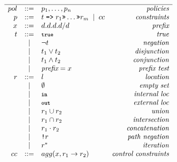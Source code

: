 \documentclass{sig-alternate-10pt}
\newcommand{\CD}[1]{\texttt{\small #1}}  %
\newcommand{\KW}[1]{\texttt{\small\bfseries{#1}}}
\newcommand{\True}{\CD{true}}
\newcommand{\Prefer}{\texttt{>>}}
\newcommand{\Path}{\texttt{=>}}
\newcommand{\In}{\KW{in}}
\newcommand{\Out}{\KW{out}}
\newcommand{\NOT}{\texttt{!}}
\begin{document}
\begin{figure}[t]\small
  \begin{minipage}[t]{.45\linewidth}
  \vspace*{-1\baselineskip}
  \[ \begin{array}{rclr}
    \hline%

     pol     &::=& p_1, \dots, p_n & \textit{policies} \\
     p       &::=& t \hspace{.3em} \Path \hspace{.3em} r_1 \Prefer \dots \Prefer r_m \BNFALT cc & \textit{constraints} \\
     x       &::=& d.d.d.d/d & \textit{prefix} \\
     t       &::=& \True & \textit{true} \\
         &\BNFALT& \neg t & \textit{negation} \\
         &\BNFALT& t_1 \vee t_2 & \textit{disjunction} \\
         &\BNFALT& t_1 \wedge t_2 & \textit{conjunction} \\
         &\BNFALT& \textit{prefix} = x & \textit{prefix test} \\
     r       &::=& l & \textit{location} \\
         &\BNFALT& \emptyset & \textit{empty set} \\
         &\BNFALT& \In & \textit{internal loc} \\
         &\BNFALT& \Out & \textit{external loc} \\
         &\BNFALT& r_1 \cup r_2 & \textit{union} \\
         &\BNFALT& r_1 \cap r_2 & \textit{intersection} \\
         &\BNFALT& r_1 \cdot r_2 & \textit{concatenation} \\
         &\BNFALT& \NOT r & \textit{path negation} \\
         &\BNFALT& r^* & \textit{iteration} \\
     cc     &::=& agg(x, r_1 \rightarrow r_2)  & \textit{control constraints} \\
  \end{array} \]%


\end{minipage}
\end{figure}
\end{document}
